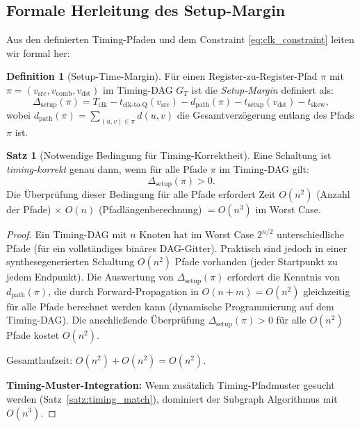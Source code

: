 ﻿\documentclass[a4paper,12pt]{article}
\theoremstyle{definition}
\newtheorem{definition}{Definition}
\newtheorem{satz}{Satz}
\begin{document}
\subsection{Formale Herleitung des Setup-Margin}

Aus den definierten Timing-Pfaden und dem Constraint \eqref{eq:clk_constraint} leiten
wir formal her:

\begin{definition}[Setup-Time-Margin]\label{def:setup_margin}
  Für einen Register-zu-Register-Pfad $\pi$ mit $\pi = (v_{\text{src}}, v_{\text{comb}},
  v_{\text{dst}})$ im Timing-DAG $G_T$ ist die \emph{Setup-Margin} definiert als:
  \[
    \Delta_{\text{setup}}(\pi) = T_{\text{clk}} - t_{\text{clk-to-Q}}(v_{\text{src}})
    - d_{\text{path}}(\pi) - t_{\text{setup}}(v_{\text{dst}}) - t_{\text{skew}},
  \]
  wobei $d_{\text{path}}(\pi) = \sum_{(u,v) \in \pi} d(u,v)$ die Gesamtverzögerung
  entlang des Pfads $\pi$ ist.
\end{definition}

\begin{satz}[Notwendige Bedingung für Timing-Korrektheit]\label{satz:timing_correct}
  Eine Schaltung ist \emph{timing-korrekt} genau dann, wenn für alle Pfade
  $\pi$ im Timing-DAG gilt:
  \[
    \Delta_{\text{setup}}(\pi) > 0.
  \]
  Die Überprüfung dieser Bedingung für alle Pfade erfordert Zeit $O(n^2)$ (Anzahl der
  Pfade) $\times$ $O(n)$ (Pfadlängenberechnung) $= O(n^3)$ im Worst Case.
\end{satz}

\begin{proof}
  Ein Timing-DAG mit $n$ Knoten hat im Worst Case $2^{n/2}$ unterschiedliche Pfade
  (für ein vollständiges binäres DAG-Gitter). Praktisch sind jedoch in einer
  synthesegenerierten Schaltung $O(n^2)$ Pfade vorhanden (jeder Startpunkt zu jedem
  Endpunkt). Die Auswertung von $\Delta_{\text{setup}}(\pi)$ erfordert die Kenntnis
  von $d_{\text{path}}(\pi)$, die durch Forward-Propagation in $O(n + m) = O(n^2)$
  gleichzeitig für alle Pfade berechnet werden kann (dynamische Programmierung auf
  dem Timing-DAG). Die anschließende Überprüfung $\Delta_{\text{setup}}(\pi) > 0$ für
  alle $O(n^2)$ Pfade kostet $O(n^2)$.

  Gesamtlaufzeit: $O(n^2) + O(n^2) = O(n^2)$.

  \textbf{Timing-Muster-Integration:} Wenn zusätzlich Timing-Pfadmuster gesucht werden
  (Satz~\ref{satz:timing_match}), dominiert der Subgraph Algorithmus mit $O(n^3)$.
\end{proof}
\end{document}
